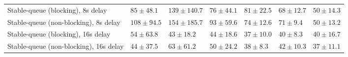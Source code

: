 \begin{table}[H]
{\begin{tabular}{l w{c}{5.0em} w{c}{5.0em} w{c}{5.0em} w{c}{5.0em} w{c}{5.0em} w{c}{5.0em}}
Stable-queue (blocking), 8s delay & $85\pm48.1$ & $139\pm140.7$ & $76\pm44.1$ & $81\pm22.5$ & $68\pm12.7$ & $50\pm14.3$ \\
Stable-queue (non-blocking), 8s delay & $108\pm94.5$ & $154\pm185.7$ & $93\pm59.6$ & $74\pm12.6$ & $71\pm9.4$ & $50\pm13.2$ \\
Stable-queue (blocking), 16s delay & $54\pm63.8$ & $43\pm18.2$ & $44\pm18.6$ & $37\pm10.0$ & $40\pm8.3$ & $40\pm16.7$ \\
Stable-queue (non-blocking), 16s delay & $44\pm37.5$ & $63\pm61.2$ & $50\pm24.2$ & $38\pm8.3$ & $42\pm10.3$ & $37\pm11.1$ \\
\bottomrule
\end{tabular}%
}
\end{table}

